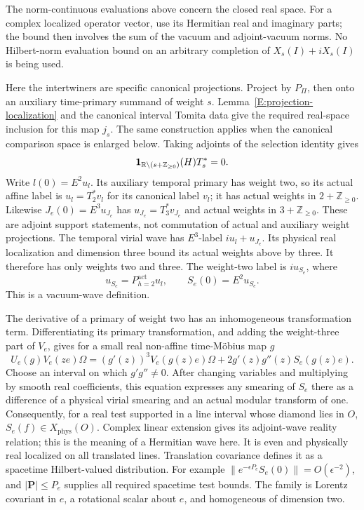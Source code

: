 The norm-continuous evaluations above concern the closed real space.
For a complex localized operator vector, use its Hermitian real and
imaginary parts; the bound then involves the sum of the vacuum and
adjoint-vacuum norms.  No Hilbert-norm evaluation bound on an arbitrary
completion of $X_s(I)+iX_s(I)$ is being used.

Here the intertwiners are specific canonical projections.  Project by
$P_\Pi$, then onto an auxiliary time-primary summand of weight $s$.
Lemma~\ref{E:projection-localization} and the canonical interval
Tomita data give the required real-space inclusion for this map $j_s$.
The same construction applies when the canonical comparison space is
enlarged below.  Taking adjoints of the selection identity gives
\[
 \mathbf1_{\mathbb R\setminus(s+\mathbb Z_{\geq0})}(H)T_s^*=0.
\]
Write $l(0)=E^2u_l$.  Its auxiliary temporal primary has weight two,
so its actual affine label is $u_l=T_2^*v_l$ for its canonical label
$v_l$; it has actual weights in $2+\mathbb Z_{\geq0}$.
Likewise $J_e(0)=E^3u_{J_e}$ has
$u_{J_e}=T_3^*v_{J_e}$ and actual weights in
$3+\mathbb Z_{\geq0}$.  These are adjoint support statements, not
commutation of actual and auxiliary weight projections.
The temporal virial wave has $E^3$-label $iu_l+u_{J_e}$.
Its physical real localization and dimension three bound its actual
weights above by three.  It therefore has only weights two and three.
The weight-two label is $iu_{S_e}$, where
\begin{equation}\label{E:definition-Se}
 u_{S_e}=P^{\mathrm{act}}_{h=2}u_l,
 \qquad S_e(0)=E^2u_{S_e}.
\end{equation}
This is a vacuum-wave definition.

The derivative of a primary of weight two has an inhomogeneous
transformation term.  Differentiating its primary transformation, and
adding the weight-three part of $V_e$, gives for a small real
non-affine time-M\"obius map $g$
\begin{equation}\label{E:finite-difference}
 U_e(g)V_e(ze)\Omega
  =(g'(z))^3V_e(g(z)e)\Omega
     +2g'(z)g''(z)S_e(g(z)e).
\end{equation}
Choose an interval on which $g'g''\ne0$.  After changing variables and
multiplying by smooth real coefficients, this equation expresses any
smearing of $S_e$ there as a difference of a physical virial smearing
and an actual modular transform of one.  Consequently, for a real test
supported in a line interval whose diamond lies in $O$,
$S_e(f)\in X_{\mathrm{phys}}(O)$.  Complex linear extension gives its
adjoint-wave reality relation; this is the meaning of a Hermitian wave
here.  It is even and physically real localized on all translated lines.
Translation
covariance defines it as a spacetime Hilbert-valued distribution.  For
example $\|e^{-\epsilon P_e}S_e(0)\|=O(\epsilon^{-2})$,
and $|\boldsymbol P|\leq P_e$ supplies all required spacetime test
bounds.  The family is Lorentz covariant in $e$, a rotational scalar
about $e$, and homogeneous of dimension two.

